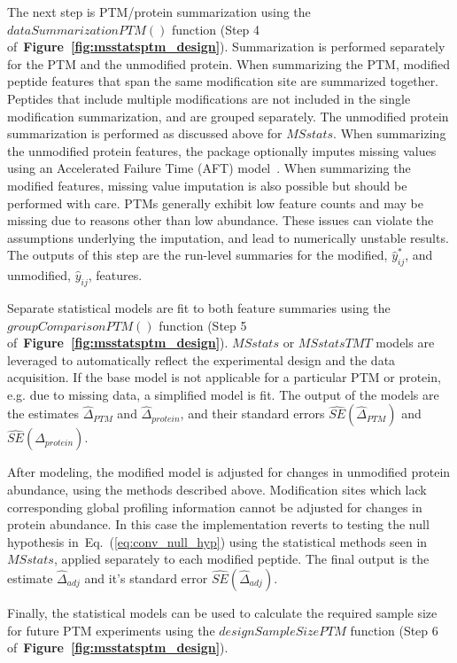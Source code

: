 \documentclass[mcp]{article}
\numberwithin{table}{section}
\def\eqref#1{Eq.~(\ref{eq:#1})}
\def\figref#1{{\bf Figure~\ref{fig:#1}}}
\begin{document}
The next step is PTM/protein summarization using the $dataSummarizationPTM()$ function (Step 4 of~\figref{msstatsptm_design}). Summarization is performed separately for the PTM and the unmodified protein. When summarizing the PTM, modified peptide features that span the same modification site are summarized together. Peptides that include multiple modifications are not included in the single modification summarization, and are grouped separately. The unmodified protein summarization is performed as discussed above for $MSstats$. When summarizing the unmodified protein features, the package optionally imputes missing values using an Accelerated Failure Time (AFT) model~\cite{Wei:1992}. When summarizing the modified features, missing value imputation is also possible but should be performed with care. PTMs generally exhibit low feature counts and may be missing due to reasons other than low abundance. These issues can violate the assumptions underlying the imputation, and lead to numerically unstable results. The outputs of this step are the run-level summaries for the modified, $\hat{y}_{ij}^{\ast}$, and unmodified, $\hat{y}_{ij}$, features.

Separate statistical models are fit to both feature summaries using the $groupComparisonPTM()$ function (Step 5 of~\figref{msstatsptm_design}). $MSstats$ or $MSstatsTMT$ models are leveraged to automatically reflect the experimental design and the data acquisition. If the base model is not applicable for a particular PTM or protein, e.g. due to missing data, a simplified model is fit. The output of the models are the estimates $\hat{\Delta}_{PTM}$ and $\hat{\Delta}_{protein}$, and their standard errors $\widehat{SE}(\hat{\Delta}_{PTM})$ and $\widehat{SE}(\hat{\Delta}_{protein})$. 

After modeling, the modified model is adjusted for changes in unmodified protein abundance, using the methods described above. Modification sites which lack corresponding global profiling information cannot be adjusted for changes in protein abundance. In this case the implementation reverts to testing the null hypothesis in~\eqref{conv_null_hyp} using the statistical methods seen in $MSstats$, applied separately to each modified peptide. The final output is the estimate $\hat{\Delta}_{adj}$ and it's standard error $\widehat{SE}(\hat{\Delta}_{adj})$.

Finally, the statistical models can be used to calculate the required sample size for future PTM experiments using the $designSampleSizePTM$ function (Step 6 of~\figref{msstatsptm_design}).
\end{document}

